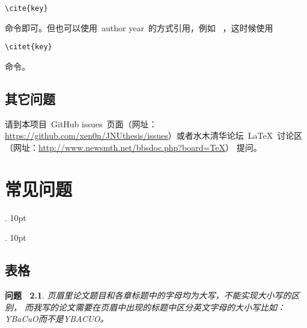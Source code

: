\documentclass[pdftex, twoside, bachelor]{JNUthesis}
\begin{document}
\begin{spacing}{1.25}
\begin{verbatim}
\cite{key}
\end{verbatim}

\noindent 命令即可。但也可以使用~author year~的方式引用，例如~
\citet{Al-Osh1987}，这时候使用

\begin{verbatim}
\citet{key}
\end{verbatim}

\noindent 命令。


\section{其它问题}

请到本项目~GitHub issues~页面（网址：
\url{https://github.com/xen0n/JNUthesis/issues}）或者水木清华论坛~\LaTeX{}~讨论区
（网址：\url{http://www.newsmth.net/bbsdoc.php?board=TeX}）
提问。

\chapter{常见问题}
\label{C:FAQ}


  {}%
  {}%
  {\rm}%
  {}%
  {\bfseries}%
  {.}%
  {10pt}%
  {}%

  {}%
  {}%
  {\rm}%
  {}%
  {\bfseries}%
  {.}%
  {10pt}%
  {}%

\theoremstyle{question}
 \newtheorem{FAQ}{问题~}
\theoremstyle{answer}
 \newtheorem{ANS}{回答~}

\section{表格}

\begin{FAQ}
页眉里论文题目和各章标题中的字母均为大写，不能实现大小写的区别，
而我写的论文需要在页眉中出现的标题中区分英文字母的大小写比如：
YBaCuO而不是YBACUO。
\end{FAQ}


\end{spacing}
\end{document}
